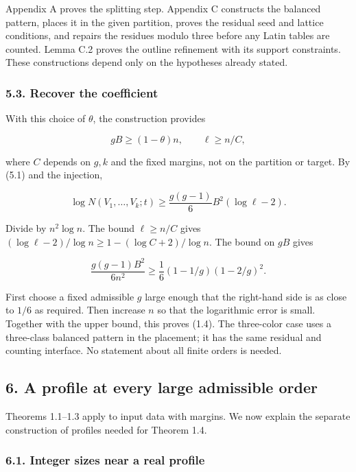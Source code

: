 \documentclass[english,11pt,a4paper]{article}
\begin{document}
Appendix A proves the splitting step. Appendix C constructs the balanced pattern, places it in the given partition, proves the residual seed and lattice conditions, and repairs the residues modulo three before any Latin tables are counted. Lemma C.2 proves the outline refinement with its support constraints. These constructions depend only on the hypotheses already stated.

\subsubsection{5.3. Recover the coefficient}\label{recover-the-coefficient}

With this choice of \(\theta\), the construction provides

\[gB\ge(1-\theta)n,\qquad \ell\ge n/C,\]

where \(C\) depends on \(g,k\) and the fixed margins, not on the partition or target. By (5.1) and the injection,

\[\log N(V_1,\ldots,V_k;t)\ge\frac{g(g-1)}6 B^2(\log\ell-2).\tag{5.3}\]

Divide by \(n^2\log n\). The bound \(\ell\ge n/C\) gives \((\log\ell-2)/\log n\ge1-(\log C+2)/\log n\). The bound on \(gB\) gives

\[\frac{g(g-1)B^2}{6n^2}\ge\frac16(1-1/g)(1-2/g)^2.\]

First choose a fixed admissible \(g\) large enough that the right-hand side is as close to \(1/6\) as required. Then increase \(n\) so that the logarithmic error is small. Together with the upper bound, this proves (1.4). The three-color case uses a three-class balanced pattern in the placement; it has the same residual and counting interface. No statement about all finite orders is needed.

\subsection{6. A profile at every large admissible order}\label{a-profile-at-every-large-admissible-order}

Theorems 1.1--1.3 apply to input data with margins. We now explain the separate construction of profiles needed for Theorem 1.4.

\subsubsection{6.1. Integer sizes near a real profile}\label{integer-sizes-near-a-real-profile}
\end{document}
